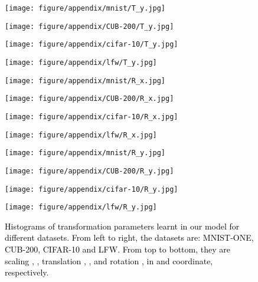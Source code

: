 \documentclass{article} \usepackage{iclr2017_conference,times}
\begin{document}
\begin{figure}[!ht]
\begin{minipage}{0.246\linewidth}
\center
\texttt{[image: figure/appendix/mnist/T\_y.jpg]}
\end{minipage}
\begin{minipage}{0.246\linewidth}
\center
\texttt{[image: figure/appendix/CUB-200/T\_y.jpg]}
\end{minipage}
\begin{minipage}{0.246\linewidth}
\center
\texttt{[image: figure/appendix/cifar-10/T\_y.jpg]}
\end{minipage}
\begin{minipage}{0.246\linewidth}
\center
\texttt{[image: figure/appendix/lfw/T\_y.jpg]}
\end{minipage}

\begin{minipage}{0.246\linewidth}
\center
\texttt{[image: figure/appendix/mnist/R\_x.jpg]}
\end{minipage}
\begin{minipage}{0.246\linewidth}
\center
\texttt{[image: figure/appendix/CUB-200/R\_x.jpg]}
\end{minipage}
\begin{minipage}{0.246\linewidth}
\center
\texttt{[image: figure/appendix/cifar-10/R\_x.jpg]}
\end{minipage}
\begin{minipage}{0.246\linewidth}
\center
\texttt{[image: figure/appendix/lfw/R\_x.jpg]}
\end{minipage}

\begin{minipage}{0.246\linewidth}
\center
\texttt{[image: figure/appendix/mnist/R\_y.jpg]}
\end{minipage}
\begin{minipage}{0.246\linewidth}
\center
\texttt{[image: figure/appendix/CUB-200/R\_y.jpg]}
\end{minipage}
\begin{minipage}{0.246\linewidth}
\center
\texttt{[image: figure/appendix/cifar-10/R\_y.jpg]}
\end{minipage}
\begin{minipage}{0.246\linewidth}
\center
\texttt{[image: figure/appendix/lfw/R\_y.jpg]}
\end{minipage}
\caption{\textcolor{black}{Histograms of transformation parameters learnt in our model for different datasets. From left to right, the datasets are: MNIST-ONE, CUB-200, CIFAR-10 and LFW. From top to bottom, they are scaling , , translation , , and rotation ,  in  and  coordinate, respectively.}}
\label{Fig_Histograms}
\end{figure} 
\end{document}
